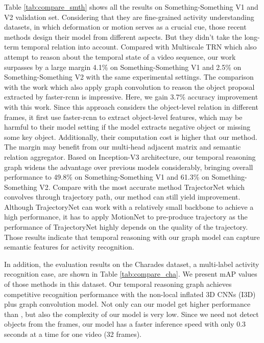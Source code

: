 \documentclass[conference,compsoc]{IEEEtran}
\begin{document}
    Table \ref{tab:compare_smth} shows all the results on Something-Something V1 and V2 validation set. Considering that they are fine-grained activity understanding datasets, in which deformation or motion serves as a crucial cue, those recent methods design their model from different aspects. But they didn't take the long-term temporal relation into account. Compared with Multiscale TRN which also attempt to reason about the temporal state of a video sequence, our work surpasses by a large margin 4.1\% on Something-Something V1 and 2.5\% on Something-Something V2 with the same experimental settings. The comparison with the work \cite{wang2018videos} which also apply graph convolution to reason the object proposal extracted by faster-rcnn \cite{ren2015faster} is impressive. Here, we gain 3.7\% accuracy improvement with this work. Since this approach considers the object-level relation in different frames, it first use faster-rcnn to extract object-level features, which may be harmful to their model setting if the model extracts negative object or missing some key object. Additionally, their computation cost is higher that our method. The margin may benefit from our multi-head adjacent matrix and semantic relation aggregator. Based on Inception-V3 architecture, our temporal reasoning graph widens the advantage over previous models considerably, bringing overall performance to 49.8\% on Something-Something V1 and 61.3\% on Something-Something V2. Compare with the most accurate method TrajectorNet which convolves through trajectory path, our method can still yield improvement. Although TrajectoryNet can work with a relatively small backbone to achieve a high performance, it has to apply MotionNet \cite{zhu2018hidden} to pre-produce trajectory as the performance of TrajectoryNet highly depends on the quality of the trajectory. Those results indicate that temporal reasoning with our graph model can capture semantic features for activity recognition. 
    
    In addition, the evaluation results on the Charades dataset, a multi-label activity recognition case, are shown in Table \ref{tab:compare_cha}. We present mAP values of those methods in this dataset. Our temporal reasoning graph achieves competitive recognition performance with the non-local inflated 3D CNNs (I3D) plus graph convolution model. Not only can our model get higher performance than \cite{wang2018videos}, but also the complexity of our model is very low. Since we need not detect objects from the frames, our model has a faster inference speed with only 0.3 seconds at a time for one video (32 frames).
\end{document}
